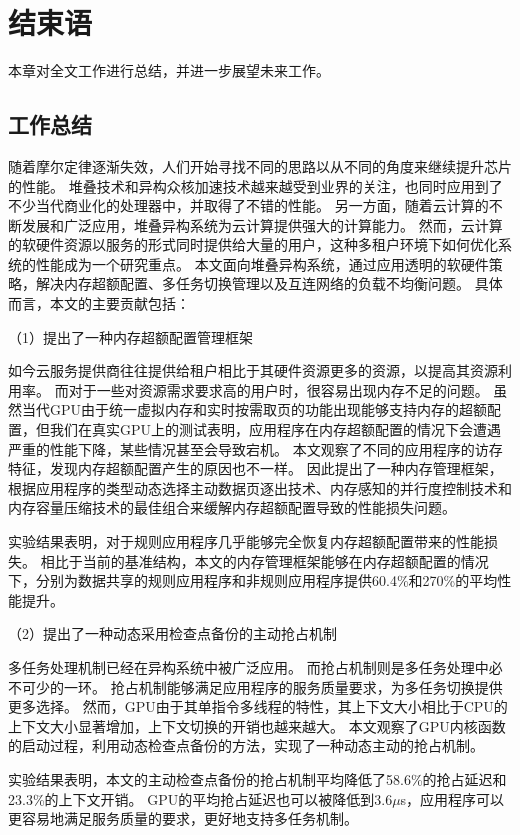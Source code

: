\chapter{结束语}
\label{chap:conclusion}

本章对全文工作进行总结，并进一步展望未来工作。

\section{工作总结}
随着摩尔定律逐渐失效，人们开始寻找不同的思路以从不同的角度来继续提升芯片的性能。
堆叠技术和异构众核加速技术越来越受到业界的关注，也同时应用到了不少当代商业化的处理器中，并取得了不错的性能。
另一方面，随着云计算的不断发展和广泛应用，堆叠异构系统为云计算提供强大的计算能力。
然而，云计算的软硬件资源以服务的形式同时提供给大量的用户，这种多租户环境下如何优化系统的性能成为一个研究重点。
本文面向堆叠异构系统，通过应用透明的软硬件策略，解决内存超额配置、多任务切换管理以及互连网络的负载不均衡问题。
具体而言，本文的主要贡献包括：

（1）提出了一种内存超额配置管理框架

如今云服务提供商往往提供给租户相比于其硬件资源更多的资源，以提高其资源利用率。
而对于一些对资源需求要求高的用户时，很容易出现内存不足的问题。
虽然当代GPU由于统一虚拟内存和实时按需取页的功能出现能够支持内存的超额配置，但我们在真实GPU上的测试表明，应用程序在内存超额配置的情况下会遭遇严重的性能下降，某些情况甚至会导致宕机。
本文观察了不同的应用程序的访存特征，发现内存超额配置产生的原因也不一样。
因此提出了一种内存管理框架，根据应用程序的类型动态选择主动数据页逐出技术、内存感知的并行度控制技术和内存容量压缩技术的最佳组合来缓解内存超额配置导致的性能损失问题。

实验结果表明，对于规则应用程序几乎能够完全恢复内存超额配置带来的性能损失。
相比于当前的基准结构，本文的内存管理框架能够在内存超额配置的情况下，分别为数据共享的规则应用程序和非规则应用程序提供60.4\%和270\%的平均性能提升。

（2）提出了一种动态采用检查点备份的主动抢占机制

多任务处理机制已经在异构系统中被广泛应用。
而抢占机制则是多任务处理中必不可少的一环。
抢占机制能够满足应用程序的服务质量要求，为多任务切换提供更多选择。
然而，GPU由于其单指令多线程的特性，其上下文大小相比于CPU的上下文大小显著增加，上下文切换的开销也越来越大。
本文观察了GPU内核函数的启动过程，利用动态检查点备份的方法，实现了一种动态主动的抢占机制。

实验结果表明，本文的主动检查点备份的抢占机制平均降低了58.6\%的抢占延迟和23.3\%的上下文开销。
GPU的平均抢占延迟也可以被降低到3.6$\mu$s，应用程序可以更容易地满足服务质量的要求，更好地支持多任务机制。

